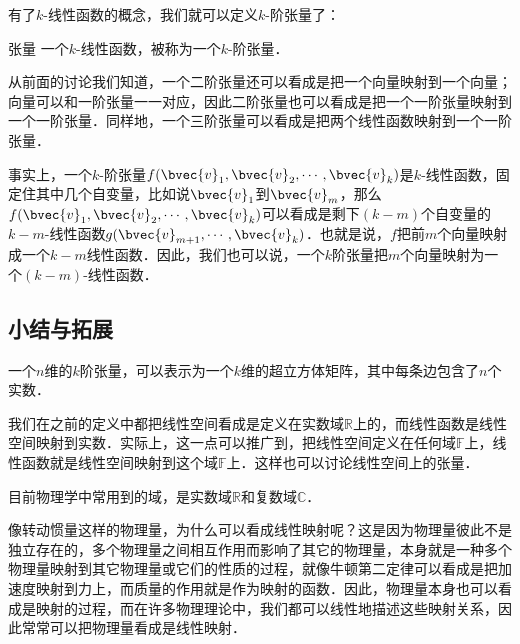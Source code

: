 有了$k$-线性函数的概念，我们就可以定义$k$-阶张量了：

\begin{definition}{张量}
一个$k$-线性函数，被称为一个$k$-阶张量．
\end{definition}

从前面的讨论我们知道，一个二阶张量还可以看成是把一个向量映射到一个向量；向量可以和一阶张量一一对应，因此二阶张量也可以看成是把一个一阶张量映射到一个一阶张量．同样地，一个三阶张量可以看成是把两个线性函数映射到一个一阶张量．

事实上，一个$k$-阶张量$f(\bvec{v}_1, \bvec{v}_2, \cdots,\bvec{v}_k)$是$k$-线性函数，固定住其中几个自变量，比如说$\bvec{v}_1$到$\bvec{v}_m$，那么$f(\bvec{v}_1, \bvec{v}_2,\cdots,\bvec{v}_k)$可以看成是剩下$(k-m)$个自变量的$k-m$-线性函数$g(\bvec{v}_{m+1}, \cdots,\bvec{v}_k)$．也就是说，$f$把前$m$个向量映射成一个$k-m$线性函数．因此，我们也可以说，一个$k$阶张量把$m$个向量映射为一个$(k-m)$-线性函数．

\subsection{小结与拓展}

一个$n$维的$k$阶张量，可以表示为一个$k$维的超立方体矩阵，其中每条边包含了$n$个实数．

我们在之前的定义中都把线性空间看成是定义在实数域$\mathbb{R}$上的，而线性函数是线性空间映射到实数．实际上，这一点可以推广到，把线性空间定义在任何域$\mathbb{F}$上，线性函数就是线性空间映射到这个域$\mathbb{F}$上．这样也可以讨论线性空间上的张量．

目前物理学中常用到的域，是实数域$\mathbb{R}$和复数域$\mathbb{C}$．

像转动惯量这样的物理量，为什么可以看成线性映射呢？这是因为物理量彼此不是独立存在的，多个物理量之间相互作用而影响了其它的物理量，本身就是一种多个物理量映射到其它物理量或它们的性质的过程，就像牛顿第二定律可以看成是把加速度映射到力上，而质量的作用就是作为映射的函数．因此，物理量本身也可以看成是映射的过程，而在许多物理理论中，我们都可以线性地描述这些映射关系，因此常常可以把物理量看成是线性映射．
